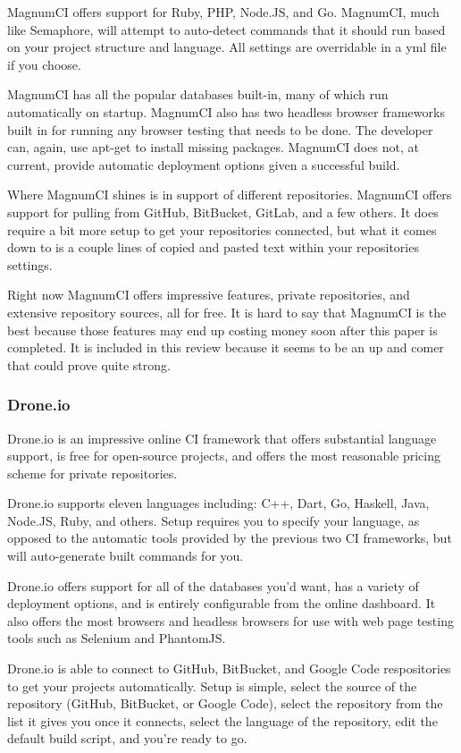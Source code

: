 \documentclass[11pt]{article}
\begin{document}
MagnumCI offers support for Ruby, PHP, Node.JS, and Go. MagnumCI, much like Semaphore, will attempt to auto-detect commands that it should run based on your project structure and language. All settings are overridable in a yml file if you choose.

MagnumCI has all the popular databases built-in, many of which run automatically on startup. MagnumCI also has two headless browser frameworks built in for running any browser testing that needs to be done. The developer can, again, use apt-get to install missing packages. MagnumCI does not, at current, provide automatic deployment options given a successful build.

Where MagnumCI shines is in support of different repositories. MagnumCI offers support for pulling from GitHub, BitBucket, GitLab, and a few others. It does require a bit more setup to get your repositories connected, but what it comes down to is a couple lines of copied and pasted text within your repositories settings.

Right now MagnumCI offers impressive features, private repositories, and extensive repository sources, all for free. It is hard to say that MagnumCI is the best because those features may end up costing money soon after this paper is completed. It is included in this review because it seems to be an up and comer that could prove quite strong.

\subsubsection{Drone.io \cite{DroneIO}}
Drone.io is an impressive online CI framework that offers substantial language support, is free for open-source projects, and offers the most reasonable pricing scheme for private repositories.

Drone.io supports eleven languages including: C++, Dart, Go, Haskell, Java, Node.JS, Ruby, and others. Setup requires you to specify your language, as opposed to the automatic tools provided by the previous two CI frameworks, but will auto-generate built commands for you.

Drone.io offers support for all of the databases you'd want, has a variety of deployment options, and is entirely configurable from the online dashboard. It also offers the most browsers and headless browsers for use with web page testing tools such as Selenium and PhantomJS.

Drone.io is able to connect to GitHub, BitBucket, and Google Code respositories to get your projects automatically. Setup is simple, select the source of the repository (GitHub, BitBucket, or Google Code), select the repository from the list it gives you once it connects, select the language of the repository, edit the default build script, and you're ready to go.
\end{document}
